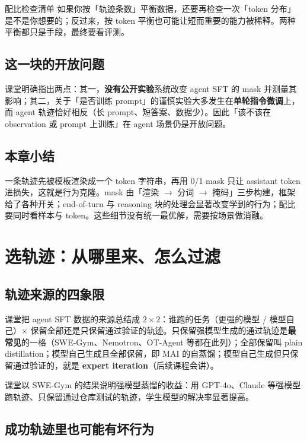 \documentclass[a4paper]{article}
\begin{document}
\begin{knowledgebox}{配比检查清单}
如果你按「轨迹条数」平衡数据，还要再检查一次「token 分布」是不是你想要的；反过来，按 token 平衡也可能让短而重要的能力被稀释。两种平衡都只是手段，最终要看评测。
\end{knowledgebox}

\subsection{这一块的开放问题}

课堂明确指出两点：其一，\textbf{没有公开实验}系统改变 agent SFT 的 mask 并测量其影响；其二，关于「是否训练 prompt」的谨慎实验大多发生在\textbf{单轮指令微调}上，而 agent 轨迹恰好相反（长 prompt、短答案、数据少）。因此「该不该在 observation 或 prompt 上训练」在 agent 场景仍是开放问题。

\subsection{本章小结}
一条轨迹先被模板渲染成一个 token 字符串，再用 0/1 mask 只让 assistant token 进损失，这就是行为克隆。mask 由「渲染 $\rightarrow$ 分词 $\rightarrow$ 掩码」三步构建，框架给了各种开关；end-of-turn 与 reasoning 块的处理会显著改变学到的行为；配比要同时看样本与 token。这些细节没有统一最优解，需要按场景做消融。

\section{选轨迹：从哪里来、怎么过滤}

\subsection{轨迹来源的四象限}

课堂把 agent SFT 数据的来源总结成 $2\times 2$：谁跑的任务（更强的模型 / 模型自己）$\times$ 保留全部还是只保留通过验证的轨迹。只保留强模型生成的通过轨迹是\textbf{最常见}的一格（SWE-Gym、Nemotron、OT-Agent 等都在此列）；全部保留叫 plain distillation；模型自己生成且全部保留，即 MAI 的自蒸馏；模型自己生成但只保留通过验证的，就是 \textbf{expert iteration}（后续课程会讲）。

课堂以 SWE-Gym 的结果说明强模型蒸馏的收益：用 GPT-4o、Claude 等强模型跑轨迹、只保留通过仓库测试的轨迹，学生模型的解决率显著提高。

\subsection{成功轨迹里也可能有坏行为}
\end{document}
